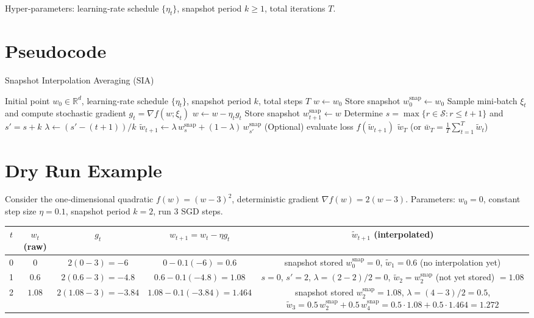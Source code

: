 \documentclass{article}
\newcommand{\R}{\mathbb{R}}
\begin{document}
Hyper‑parameters: learning‑rate schedule $\{\eta_t\}$, snapshot period $k\ge 1$, total iterations $T$.

\section*{Pseudocode}
\begin{algorithm}[H]
\caption{Snapshot Interpolation Averaging (SIA)}
\begin{algorithmic}[1]
\REQUIRE Initial point $w_0\in\R^{d}$, learning‑rate schedule $\{\eta_t\}$, snapshot period $k$, total steps $T$
\STATE $w \leftarrow w_0$ 
\STATE Store snapshot $w^{\mathrm{snap}}_{0}\leftarrow w_0$
    \STATE Sample mini‑batch $\xi_t$ and compute stochastic gradient $g_t=\nabla f(w;\xi_t)$
    \STATE $w \leftarrow w - \eta_t g_t$ 
        \STATE Store snapshot $w^{\mathrm{snap}}_{t+1}\leftarrow w$
    \ENDIF
    \STATE Determine $s=\max\{r\in\mathcal{S}:r\le t+1\}$ and $s'=s+k$
    \STATE $\lambda \gets (s'- (t+1))/k$
    \STATE $\tilde w_{t+1}\gets \lambda\, w^{\mathrm{snap}}_{s}+ (1-\lambda)\, w^{\mathrm{snap}}_{s'}$
    \STATE (Optional) evaluate loss $f(\tilde w_{t+1})$
\ENDFOR
\RETURN $\tilde w_T$ (or $\bar w_T=\frac1T\sum_{t=1}^{T}\tilde w_t$)
\end{algorithmic}
\end{algorithm}

\section*{Dry Run Example}
Consider the one‑dimensional quadratic $f(w)=(w-3)^2$, deterministic gradient $ \nabla f(w)=2(w-3)$.  
Parameters: $w_0=0$, constant step size $\eta=0.1$, snapshot period $k=2$, run $3$ SGD steps.

\begin{center}
\begin{tabular}{c|c|c|c|c}
$t$ & $w_t$ (raw) & $g_t$ & $w_{t+1}=w_t-\eta g_t$ & $\tilde w_{t+1}$ (interpolated)\\ \hline
0 & $0$ & $2(0-3)=-6$ & $0-0.1(-6)=0.6$ & snapshot stored $w^{\mathrm{snap}}_{0}=0$, $\tilde w_{1}=0.6$ (no interpolation yet)\\
1 & $0.6$ & $2(0.6-3)=-4.8$ & $0.6-0.1(-4.8)=1.08$ & $s=0$, $s'=2$, $\lambda=(2-2)/2=0$, $\tilde w_{2}= w^{\mathrm{snap}}_{2}$ (not yet stored) $=1.08$\\
2 & $1.08$ & $2(1.08-3)=-3.84$ & $1.08-0.1(-3.84)=1.464$ & snapshot stored $w^{\mathrm{snap}}_{2}=1.08$, 
$\lambda=(4-3)/2=0.5$, $\tilde w_{3}=0.5\, w^{\mathrm{snap}}_{2}+0.5\, w^{\mathrm{snap}}_{4}=0.5\cdot1.08+0.5\cdot1.464=1.272$\\
\end{tabular}
\end{center}
\end{document}

